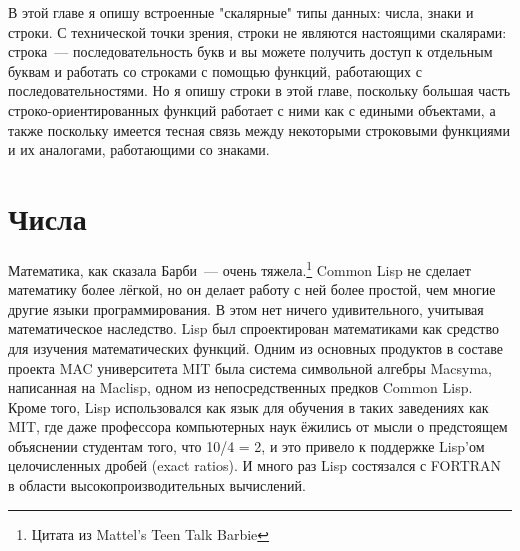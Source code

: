 В этой главе я опишу встроенные "скалярные" типы данных: числа, знаки и строки.  С
технической точки зрения, строки не являются настоящими скалярами: строка~---
последовательность букв и вы можете получить доступ к отдельным буквам и работать со
строками с помощью функций, работающих с последовательностями.  Но я опишу строки в этой
главе, поскольку большая часть строко-ориентированных функций работает с ними как с
едиными объектами, а также поскольку имеется тесная связь между некоторыми строковыми
функциями и их аналогами, работающими со знаками.

\section{Числа}

Математика, как сказала Барби~--- очень тяжела.\footnote{Цитата из Mattel's Teen Talk
  Barbie} Common Lisp не сделает математику более лёгкой, но он делает работу с ней более
простой, чем многие другие языки программирования.  В этом нет ничего удивительного,
учитывая математическое наследство.  Lisp был спроектирован математиками как средство для
изучения математических функций.  Одним из основных продуктов в составе проекта MAC
университета MIT была система символьной алгебры Macsyma, написанная на Maclisp, одном из
непосредственных предков Common Lisp.  Кроме того, Lisp использовался как язык для
обучения в таких заведениях как MIT, где даже профессора компьютерных наук ёжились от
мысли о предстоящем объяснении студентам того, что 10/4 = 2, и это привело к поддержке
Lisp'ом целочисленных дробей (exact ratios).  И много раз Lisp состязался с FORTRAN в
области высокопроизводительных вычислений.

